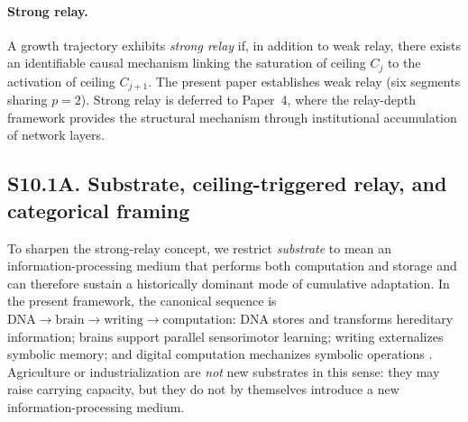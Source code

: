 \documentclass[11pt]{article}
\begin{document}
\paragraph{Strong relay.}
A growth trajectory exhibits \emph{strong relay} if, in addition to weak relay,
there exists an identifiable causal mechanism linking the saturation of ceiling
$C_j$ to the activation of ceiling $C_{j+1}$. The present paper establishes
weak relay (six segments sharing $p=2$). Strong relay is deferred to Paper~4,
where the relay-depth framework provides the structural mechanism through
institutional accumulation of network layers.

\subsection*{S10.1A. Substrate, ceiling-triggered relay, and categorical framing}

To sharpen the strong-relay concept, we restrict \emph{substrate} to mean an
information-processing medium that performs both computation and storage and can
therefore sustain a historically dominant mode of cumulative adaptation. In the
present framework, the canonical sequence is
$\mathrm{DNA}\to\mathrm{brain}\to\mathrm{writing}\to\mathrm{computation}$:
DNA stores and transforms hereditary information; brains support parallel
sensorimotor learning; writing externalizes symbolic memory; and digital
computation mechanizes symbolic operations
\cite{jablonkalamb2005,schmandtbesserat1992,turing1950}.
Agriculture or industrialization are \emph{not} new substrates in this sense:
they may raise carrying capacity, but they do not by themselves introduce a new
information-processing medium.
\end{document}
